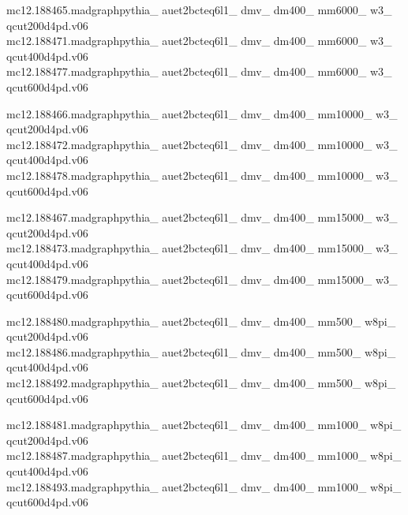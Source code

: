 mc12.188465.madgraphpythia\_ auet2bcteq6l1\_ dmv\_ dm400\_ mm6000\_ w3\_ \\ qcut200d4pd.v06\\
mc12.188471.madgraphpythia\_ auet2bcteq6l1\_ dmv\_ dm400\_ mm6000\_ w3\_ \\ qcut400d4pd.v06\\
mc12.188477.madgraphpythia\_ auet2bcteq6l1\_ dmv\_ dm400\_ mm6000\_ w3\_ \\ qcut600d4pd.v06

mc12.188466.madgraphpythia\_ auet2bcteq6l1\_ dmv\_ dm400\_ mm10000\_ w3\_ \\ qcut200d4pd.v06\\
mc12.188472.madgraphpythia\_ auet2bcteq6l1\_ dmv\_ dm400\_ mm10000\_ w3\_ \\ qcut400d4pd.v06\\
mc12.188478.madgraphpythia\_ auet2bcteq6l1\_ dmv\_ dm400\_ mm10000\_ w3\_ \\ qcut600d4pd.v06

mc12.188467.madgraphpythia\_ auet2bcteq6l1\_ dmv\_ dm400\_ mm15000\_ w3\_ \\ qcut200d4pd.v06\\
mc12.188473.madgraphpythia\_ auet2bcteq6l1\_ dmv\_ dm400\_ mm15000\_ w3\_ \\ qcut400d4pd.v06\\
mc12.188479.madgraphpythia\_ auet2bcteq6l1\_ dmv\_ dm400\_ mm15000\_ w3\_ \\ qcut600d4pd.v06

mc12.188480.madgraphpythia\_ auet2bcteq6l1\_ dmv\_ dm400\_ mm500\_ w8pi\_ \\ qcut200d4pd.v06\\
mc12.188486.madgraphpythia\_ auet2bcteq6l1\_ dmv\_ dm400\_ mm500\_ w8pi\_ \\ qcut400d4pd.v06\\
mc12.188492.madgraphpythia\_ auet2bcteq6l1\_ dmv\_ dm400\_ mm500\_ w8pi\_ \\ qcut600d4pd.v06

mc12.188481.madgraphpythia\_ auet2bcteq6l1\_ dmv\_ dm400\_ mm1000\_ w8pi\_ \\ qcut200d4pd.v06\\
mc12.188487.madgraphpythia\_ auet2bcteq6l1\_ dmv\_ dm400\_ mm1000\_ w8pi\_ \\ qcut400d4pd.v06\\
mc12.188493.madgraphpythia\_ auet2bcteq6l1\_ dmv\_ dm400\_ mm1000\_ w8pi\_ \\ qcut600d4pd.v06

